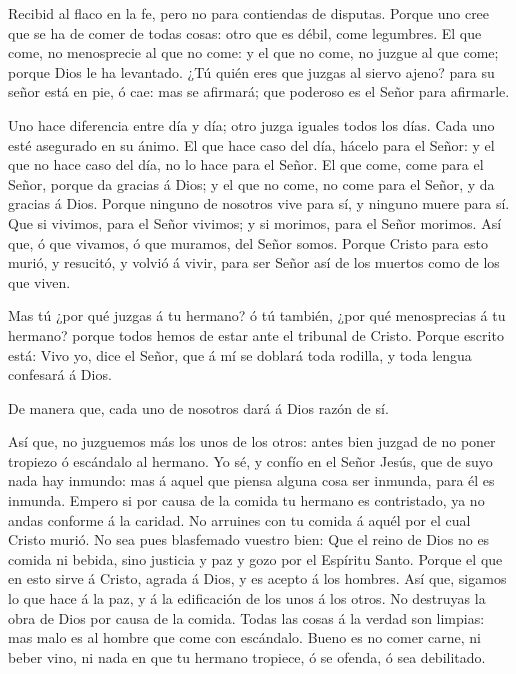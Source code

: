  Recibid al flaco en la fe, pero no para contiendas de
disputas.  Porque uno cree que se ha de comer de todas
cosas: otro que es débil, come legumbres.  El que come, no
menosprecie al que no come: y el que no come, no juzgue al que come;
porque Dios le ha levantado.  ¿Tú quién eres que juzgas al
siervo ajeno? para su señor está en pie, ó cae: mas se afirmará; que
poderoso es el Señor para afirmarle.

 Uno hace diferencia entre día y día; otro juzga iguales
todos los días. Cada uno esté asegurado en su ánimo.  El que
hace caso del día, hácelo para el Señor: y el que no hace caso del día,
no lo hace para el Señor. El que come, come para el Señor, porque da
gracias á Dios; y el que no come, no come para el Señor, y da gracias á
Dios.  Porque ninguno de nosotros vive para sí, y ninguno
muere para sí.  Que si vivimos, para el Señor vivimos; y si
morimos, para el Señor morimos. Así que, ó que vivamos, ó que muramos,
del Señor somos.  Porque Cristo para esto murió, y resucitó,
y volvió á vivir, para ser Señor así de los muertos como de los que
viven.

 Mas tú ¿por qué juzgas á tu hermano? ó tú también, ¿por
qué menosprecias á tu hermano? porque todos hemos de estar ante el
tribunal de Cristo.  Porque escrito está: Vivo yo, dice el
Señor, que á mí se doblará toda rodilla, y toda lengua confesará á Dios.

 De manera que, cada uno de nosotros dará á Dios razón de
sí.

 Así que, no juzguemos más los unos de los otros: antes
bien juzgad de no poner tropiezo ó escándalo al hermano. 
Yo sé, y confío en el Señor Jesús, que de suyo nada hay inmundo: mas á
aquel que piensa alguna cosa ser inmunda, para él es inmunda.
 Empero si por causa de la comida tu hermano es
contristado, ya no andas conforme á la caridad. No arruines con tu
comida á aquél por el cual Cristo murió.  No sea pues
blasfemado vuestro bien:  Que el reino de Dios no es comida
ni bebida, sino justicia y paz y gozo por el Espíritu Santo.
 Porque el que en esto sirve á Cristo, agrada á Dios, y es
acepto á los hombres.  Así que, sigamos lo que hace á la
paz, y á la edificación de los unos á los otros.  No
destruyas la obra de Dios por causa de la comida. Todas las cosas á la
verdad son limpias: mas malo es al hombre que come con escándalo.
 Bueno es no comer carne, ni beber vino, ni nada en que tu
hermano tropiece, ó se ofenda, ó sea debilitado.

